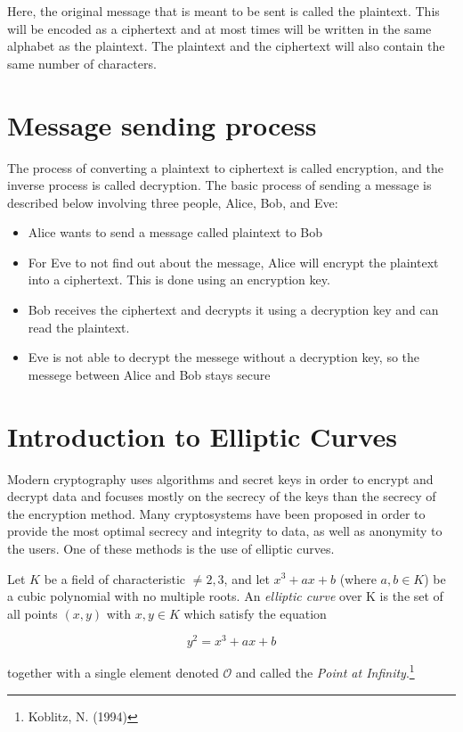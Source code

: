 \hspace{10mm}  Here, the original message that is meant to be sent is called the plaintext. This will be encoded as a ciphertext and at most times will be written in the same alphabet as the plaintext. The plaintext and the ciphertext will also contain the same number of characters. 

\section{Message sending process}

\hspace{10mm} The process of converting a plaintext to ciphertext is called encryption, and the inverse process is called decryption. The basic process of sending a message is described below involving three people, Alice, Bob, and Eve:

\begin{itemize}

\item Alice wants to send a message called plaintext to Bob
\item For Eve to not find out about the message, Alice will encrypt the plaintext into a ciphertext. This is done using an encryption key.
\item Bob receives the ciphertext and decrypts it using a decryption key and can read the plaintext.
\item Eve is not able to decrypt the messege without a  decryption key, so the messege between Alice and Bob stays secure

\end{itemize}

\section{Introduction to Elliptic Curves}


\hspace{10mm}  Modern cryptography uses algorithms and secret keys in order to encrypt and decrypt data and focuses mostly on the secrecy of the keys than the secrecy of the encryption method. Many cryptosystems have been proposed in order to provide the most optimal secrecy and integrity to data, as well as anonymity to the users. One of these methods is the use of elliptic curves.

\begin{definition}
 Let $K$ be a field of characteristic $\neq 2, 3$, and let $x^3 + ax + b$ (where $a, b \in K$) be a cubic polynomial with no multiple roots. An \textit{elliptic curve} over K is the set of all points $(x, y)$ with $x, y \in K$ which satisfy the
equation

\begin{equation}
y^2 = x^3 + ax + b
\end{equation}

together with a single element denoted $\mathcal{O}$ and called the \textit{Point at Infinity}.\footnote{Koblitz, N. (1994)}
\end{definition}
 
